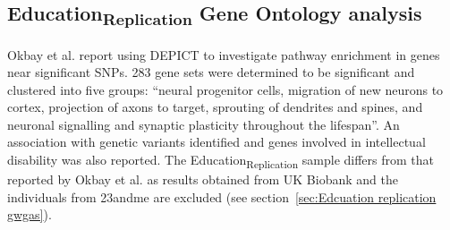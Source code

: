 




\subsection{Education\textsubscript{Replication} Gene Ontology analysis}
Okbay et al.\cite{okbay2016genome} report using DEPICT\cite{pers2015biological} to investigate pathway enrichment in genes near significant SNPs. 283 gene sets were determined to be significant and clustered into five groups: ``neural progenitor cells, migration of new neurons to cortex, projection of axons to target, sprouting of dendrites and spines, and neuronal signalling and synaptic plasticity throughout the lifespan''\cite{okbay2016genome}. An association with genetic variants identified and  genes involved in intellectual disability was also reported. The Education\textsubscript{Replication} sample differs from that reported by Okbay et al. \cite{okbay2016genome} as results obtained from UK Biobank and the individuals from 23andme are excluded (see section~\ref{sec:Edcuation replication gwgas}).



